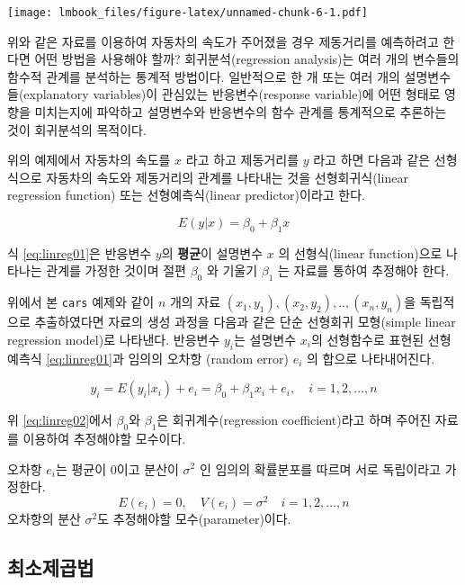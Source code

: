 \documentclass[
]{book}
\theoremstyle{definition}
\theoremstyle{definition}
\theoremstyle{definition}
\theoremstyle{definition}
\theoremstyle{remark}
\begin{document}
\texttt{[image: lmbook\_files/figure-latex/unnamed-chunk-6-1.pdf]}

위와 같은 자료를 이용하여 자동차의 속도가 주어졌을 경우 제동거리를
예측하려고 한다면 어떤 방법을 사용해야 할까? 회귀분석(regression
analysis)는 여러 개의 변수들의 함수적 관계를 분석하는 통계적 방법이다.
일반적으로 한 개 또는 여러 개의 설명변수들(explanatory variables)이
관심있는 반응변수(response variable)에 어떤 형태로 영향을 미치는지에
파악하고 설명변수와 반응변수의 함수 관계를 통계적으로 추론하는 것이
회귀분석의 목적이다.

위의 예제에서 자동차의 속도를 \(x\) 라고 하고 제동거리를 \(y\) 라고 하면
다음과 같은 선형식으로 자동차의 속도와 제동거리의 관계를 나타내는 것을
선형회귀식(linear regression function) 또는 선형예측식(linear
predictor)이라고 한다.

\begin{equation} 
E(y|x) = \beta_0 + \beta_1 x
\label{eq:linreg01}
\end{equation}

식 \eqref{eq:linreg01}은 반응변수 \(y\)의 \textbf{평균}이 설명변수 \(x\) 의
선형식(linear function)으로 나타나는 관계를 가정한 것이며 절편 \(\beta_0\)
와 기울기 \(\beta_1\) 는 자료를 통하여 추정해야 한다.

위에서 본 \texttt{cars} 예제와 같이 \(n\) 개의 자료
\((x_1,y_1),(x_2,y_2),..,(x_n, y_n)\)을 독립적으로 추출하였다면 자료의
생성 과정을 다음과 같은 단순 선형회귀 모형(simple linear regression
model)로 나타낸다. 반응변수 \(y_i\)는 설명변수 \(x_i\)의 선형함수로 표현된
선형 예측식 \eqref{eq:linreg01}과 임의의 오차항 (random error) \(e_i\) 의
합으로 나타내어진다.

\begin{equation} 
y_i = E(y_i | x_i) + e_i = \beta_0 + \beta_1 x_i + e_i, \quad i=1,2,\dots,n
\label{eq:linreg02}
\end{equation}

위 \eqref{eq:linreg02}에서 \(\beta_0\)와 \(\beta_1\)은 회귀계수(regression
coefficient)라고 하며 주어진 자료를 이용하여 추정해야할 모수이다.

오차항 \(e_i\)는 평균이 \(0\)이고 분산이 \(\sigma^2\) 인 임의의 확률분포를
따르며 서로 독립이라고 가정한다.\\
\[ E(e_i)=0, \quad V(e_i) = \sigma^2 \quad i=1,2,\dots,n \] 오차항의
분산 \(\sigma^2\)도 추정해야할 모수(parameter)이다.

\hypertarget{lse}{%
\subsection{최소제곱법}\label{lse}}
\end{document}
